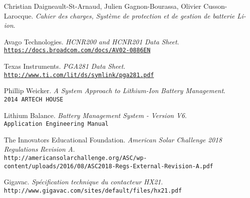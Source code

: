 \documentclass[12pt,letterpaper]{article}
\begin{document}
	\begin{thebibliography}{10}
	
	Christian Daigneault-St-Arnaud, Julien Gagnon-Bourassa, Olivier Cusson-Larocque. \textit{Cahier des charges, Système de protection et de gestion de batterie Li-ion}. \par	
	
	Avago Technologies. \textit{HCNR200 and HCNR201 Data Sheet}.\\ \texttt{\url{https://docs.broadcom.com/docs/AV02-0886EN}}\par
	
	Texas Instruments. \textit{PGA281 Data Sheet}.\\ \texttt{\url{http://www.ti.com/lit/ds/symlink/pga281.pdf}}\par

	Phillip Weicker. \textit{A System Approach to Lithium-Ion Battery Management}.\\ \texttt{2014 ARTECH HOUSE}\par	
	
	Lithium Balance. \textit{Battery Management System - Version V6}.\\ \texttt{Application Engineering Manual}\par	

	The Innovators Educational Foundation. \textit{American Solar Challenge 2018 Regulations Revision A}.\\ \texttt{http://americansolarchallenge.org/ASC/wp-content/uploads/2016/08/ASC2018-Regs-External-Revision-A.pdf}\par	
	
	Gigavac. \textit{Spécification technique du contacteur HX21}.\\ \texttt{http://www.gigavac.com/sites/default/files/hx21.pdf}\par	
	
	\end{thebibliography}	
	
\end{document}
